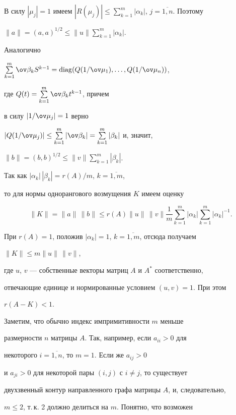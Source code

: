 В силу $|\mu_j| =1$ имеем $|R(\mu_j)| \le 


\sum\limits_{k=1}^m |\alpha_k|$, $j=\overline{1,n}$. Поэтому


$\|a\| = (a,a)^{1/2} \le \|u\| \sum\limits_{k=1}^m |\alpha_k |$.


Аналогично


$\sum\limits_{k=1}^m \ov\beta_k S^{k-1} = \diag


(Q(1/\ov\mu_1),\dotsc,Q(1/\ov\mu_n))$,


где $Q(t) = \sum\limits_{k=1}^m \ov\beta_k t^{k-1}$, причем


в силу $|1/\ov\mu_j| = 1$ верно 


$|Q(1/\ov\mu_j)| \le \sum\limits_{k=1}^m |\ov\beta_k| =


\sum\limits_{k=1}^m |\beta_k|$ и, значит,


$\|b\| = (b,b)^{1/2} \le \|v\|\sum\limits_{k=1}^m |\beta_k|$.


Так как $|\alpha_k|\, |\beta_k| = r(A)/m$, $k = \overline{1,m}$,


то для нормы однорангового возмущения $K$ имеем оценку


$$


\|K\| = \|a\|\, \|b\| \le r(A) \|u\|\, \|v\|


\frac{1}{m}\sum_{k=1}^m |\alpha_k| \sum_{k=1}^m |\alpha_k|^{-1}.


$$


При $r(A) = 1$, положив $|\alpha_k| =1$, $k = \overline{1,m}$, отсюда получаем


$\|K\| \le m \|u\|\, \|v\|$,


где $u$, $v$ --- собственные векторы матриц $A$ и $A^*$ соответственно,


отвечающие единице и нормированные условием $(u,v) = 1$. При этом


$r(A - K) < 1$.





Заметим, что обычно индекс импримитивности $m$ меньше


размерности $n$ матрицы $A$. Так, например, если $a_{ii} > 0$ для


некоторого $i = \overline{1,n}$, то $m = 1$. Если же $a_{ij} > 0$


и $a_{ji} > 0$ для некоторой пары $(i,j)$ с $i\ne j$, то существует


двухзвенный контур направленного графа матрицы $A$, и, следовательно,


$m \le 2$, т.\,к. 2 должно делиться на $m$. Понятно, что возможен


